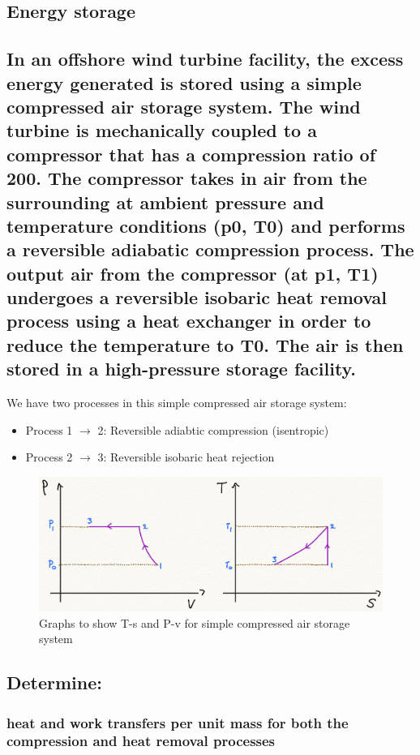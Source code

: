 \documentclass[12pt]{article}
\numberwithin{equation}{section}
\begin{document}
\begin{flushleft}
\section{Energy storage}
\subsection[Compressed air storage system.]{In an offshore wind turbine facility, the excess energy generated is stored using a simple compressed air storage system. The wind turbine is mechanically coupled to a compressor that has a compression ratio of 200. The compressor takes in air from the surrounding at ambient pressure and temperature conditions (p0, T0) and performs a reversible adiabatic compression process. The output air from the compressor (at p1, T1) undergoes a reversible isobaric heat removal process using a heat exchanger in order to reduce the temperature to T0. The air is then stored in a high-pressure storage facility.}
We have two processes in this simple compressed air storage system:
\begin{itemize}
  \item Process 1 $\rightarrow$ 2: Reversible adiabtic compression (isentropic)
  \item Process 2 $\rightarrow$ 3: Reversible isobaric heat rejection
\end{itemize}

\begin{figure}[H]
  \centering
  \includegraphics[width  = \textwidth]{./img/TsPvDiagrams62.png}
  \caption{Graphs to show T-s and P-v for simple compressed air storage system}
\end{figure}

\subsection{Determine:}
\subsubsection[Heat/Work transfers.]{heat and work transfers per unit mass for both the compression and heat removal processes}

\end{flushleft}
\end{document}
